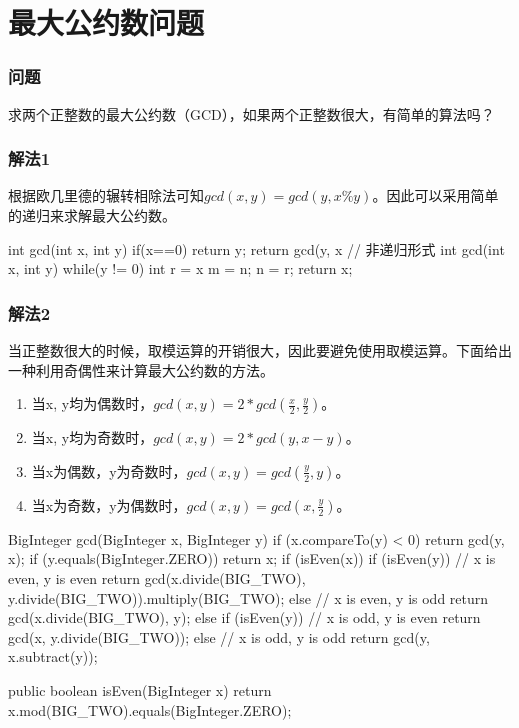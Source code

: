 \section{最大公约数问题} %
\label{sec:gcd}

\subsubsection{问题}
求两个正整数的最大公约数（GCD），如果两个正整数很大，有简单的算法吗？

\subsubsection{解法1}

根据欧几里德的辗转相除法可知$gcd(x, y) = gcd(y, x \% y)$。因此可以采用简单的递归来求解最大公约数。

\begin{Codex}[label={[$O(lg(Max(x,y)))+O(1)$]Chap02_07_GCD.java}]
int gcd(int x, int y) {
	if(x==0) return y;
	return gcd(y, x %
}
// 非递归形式
int gcd(int x, int y) {
	while(y != 0) {
		int r = x %
		m = n;
		n = r;
	}
	return x;
}
\end{Codex}

\subsubsection{解法2}

当正整数很大的时候，取模运算的开销很大，因此要避免使用取模运算。下面给出一种利用奇偶性来计算最大公约数的方法。
\begin{enumerate}
	\item 当x, y均为偶数时，$gcd(x,y) = 2 * gcd(\frac{x}{2}, \frac{y}{2})$。	
	\item 当x, y均为奇数时，$gcd(x,y) = 2 * gcd(y, x-y)$。
	\item 当x为偶数，y为奇数时，$gcd(x,y) = gcd(\frac{y}{2}, y)$。
	\item 当x为奇数，y为偶数时，$gcd(x,y) = gcd(x, \frac{y}{2})$。
\end{enumerate}

\begin{Codex}[label={[$O(lg(Max(x,y)))+O(1)$]Chap02_07_GCD.java}]
BigInteger gcd(BigInteger x, BigInteger y) {
    if (x.compareTo(y) < 0) {
        return gcd(y, x);
    }
    if (y.equals(BigInteger.ZERO)) {
        return x;
    }
    if (isEven(x)) {
        if (isEven(y)) { // x is even, y is even
    	    return gcd(x.divide(BIG_TWO), y.divide(BIG_TWO)).multiply(BIG_TWO);
        } else { // x is even, y is odd
            return gcd(x.divide(BIG_TWO), y);	
        }
    } else {
        if (isEven(y)) { // x is odd, y is even
            return gcd(x, y.divide(BIG_TWO));
        } else { // x is odd, y is odd
            return gcd(y, x.subtract(y));
        }
    }
}

public boolean isEven(BigInteger x) {
	return x.mod(BIG_TWO).equals(BigInteger.ZERO);
}
\end{Codex}

